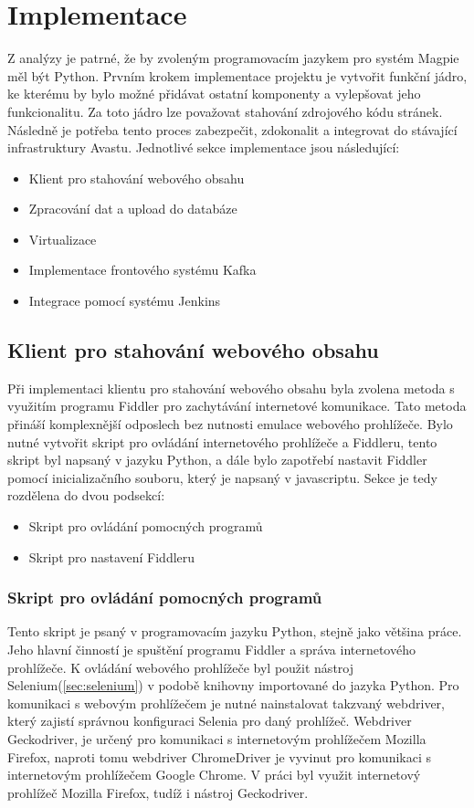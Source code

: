 \documentclass[thesis=M,czech,hidelinks]{FITthesis}[2013/05/06]
\begin{document}
\chapter{Implementace}
Z analýzy je patrné, že by zvoleným programovacím jazykem pro systém Magpie měl být Python. Prvním krokem implementace projektu je vytvořit funkční jádro, ke kterému by bylo možné přidávat ostatní komponenty a vylepšovat jeho funkcionalitu. Za toto jádro lze považovat stahování zdrojového kódu stránek. Následně je potřeba tento proces zabezpečit, zdokonalit a integrovat do stávající infrastruktury Avastu. Jednotlivé sekce implementace jsou následující:
\begin{itemize}
	\item Klient pro stahování webového obsahu
	\item Zpracování dat a upload do databáze
	\item Virtualizace 
	\item Implementace frontového systému Kafka
	\item Integrace pomocí systému Jenkins
\end{itemize} 




\section{Klient pro stahování webového obsahu} \label{sec:stahovani}
Při implementaci klientu pro stahování webového obsahu byla zvolena metoda s využitím programu Fiddler pro zachytávání internetové komunikace. Tato metoda přináší komplexnější odposlech bez nutnosti emulace webového prohlížeče. Bylo nutné vytvořit skript pro ovládání internetového prohlížeče a Fiddleru, tento skript byl napsaný v jazyku Python, a dále bylo zapotřebí nastavit Fiddler pomocí inicializačního souboru, který je napsaný v javascriptu. Sekce je tedy rozdělena do dvou podsekcí:
\begin{itemize}
	\item Skript pro ovládání pomocných programů
	\item Skript pro nastavení Fiddleru
\end{itemize}

\subsection{Skript pro ovládání pomocných programů}
Tento skript je psaný v programovacím jazyku Python, stejně jako většina práce. Jeho hlavní činností je spuštění programu Fiddler a správa internetového prohlížeče. K ovládání webového prohlížeče byl použit nástroj Selenium(\ref{sec:selenium}) v podobě knihovny importované do jazyka Python. Pro komunikaci s webovým prohlížečem je nutné nainstalovat takzvaný webdriver, který zajistí správnou konfiguraci Selenia pro daný prohlížeč. Webdriver Geckodriver\cite{gecko}, je určený pro komunikaci s internetovým prohlížečem Mozilla Firefox\cite{firefox}, naproti tomu webdriver ChromeDriver\cite{chromedriver}  je vyvinut  pro komunikaci s internetovým prohlížečem Google Chrome\cite{chrome}. V práci byl využit internetový prohlížeč Mozilla Firefox, tudíž i nástroj Geckodriver.
\end{document}
